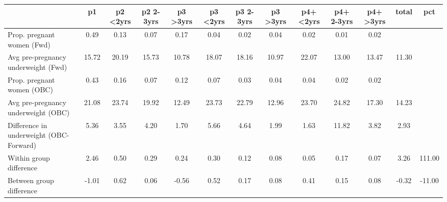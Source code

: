 \begin{tabular}{l*{12}{c}}
\toprule
            &\multicolumn{1}{c}{p1}&\multicolumn{1}{c}{p2 <2yrs}&\multicolumn{1}{c}{p2 2-3yrs}&\multicolumn{1}{c}{p3 >3yrs}&\multicolumn{1}{c}{p3 <2yrs}&\multicolumn{1}{c}{p3 2-3yrs}&\multicolumn{1}{c}{p3 >3yrs}&\multicolumn{1}{c}{p4+ <2yrs}&\multicolumn{1}{c}{p4+ 2-3yrs}&\multicolumn{1}{c}{p4+ >3yrs}&\multicolumn{1}{c}{total}&\multicolumn{1}{c}{pct}\\
\midrule
\midrule
Prop. pregnant women (Fwd)&        0.49&        0.13&        0.07&        0.17&        0.04&        0.02&        0.04&        0.02&        0.01&        0.02&            &            \\
Avg pre-pregnancy underweight (Fwd)&       15.72&       20.19&       15.73&       10.78&       18.07&       18.16&       10.97&       22.07&       13.00&       13.47&       11.30&            \\
Prop. pregnant women (OBC)&        0.43&        0.16&        0.07&        0.12&        0.07&        0.03&        0.04&        0.04&        0.02&        0.02&            &            \\
Avg pre-pregnancy underweight (OBC)&       21.08&       23.74&       19.92&       12.49&       23.73&       22.79&       12.96&       23.70&       24.82&       17.30&       14.23&            \\
Difference in underweight (OBC-Forward)&        5.36&        3.55&        4.20&        1.70&        5.66&        4.64&        1.99&        1.63&       11.82&        3.82&        2.93&            \\
Within group difference&        2.46&        0.50&        0.29&        0.24&        0.30&        0.12&        0.08&        0.05&        0.17&        0.07&        3.26&      111.00\\
Between group difference&       -1.01&        0.62&        0.06&       -0.56&        0.52&        0.17&        0.08&        0.41&        0.15&        0.08&       -0.32&      -11.00\\
\bottomrule
\end{tabular}
